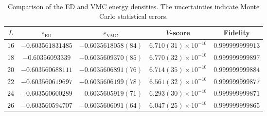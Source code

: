 \begin{table}[tb]
  \centering
  \caption{Comparison of the ED and VMC energy densities. The uncertainties indicate Monte Carlo statistical errors.}
  \label{tab:energy-vscore-fidelity}
  \begin{tabular}{ccccc}
    \toprule
    $L$ & $e_{\mathrm{ED}}$ & $e_{\mathrm{VMC}}$ & $V$-score & Fidelity \\
    \midrule
    16 & $-0.603561831485$ & $-0.6035618058(84)$ & $6.710(31) \times 10^{-10}$ & $0.999999999913$ \\
    18 & $-0.60356093339$ & $-0.6035609370(85)$ & $6.770(32) \times 10^{-10}$ & $0.999999999897$ \\
    20 & $-0.603560688111$ & $-0.6035606891(76)$ & $6.714(35) \times 10^{-10}$ & $0.999999999884$ \\
    22 & $-0.603560619697$ & $-0.6035606199(78)$ & $6.561(32) \times 10^{-10}$ & $0.999999999877$ \\
    24 & $-0.603560600289$ & $-0.6035605919(71)$ & $6.293(30) \times 10^{-10}$ & $0.999999999871$ \\
    26 & $-0.603560594707$ & $-0.6035606091(64)$ & $6.047(25) \times 10^{-10}$ & $0.999999999865$ \\
    \bottomrule
  \end{tabular}
\end{table}

